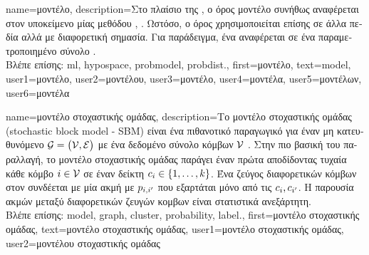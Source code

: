 {name={\foreignlanguage{greek}{μοντέλο}}, 
	description={\foreignlanguage{greek}{Στο πλαίσιο της} , 
		\foreignlanguage{greek}{ο όρος μοντέλο συνήθως αναφέρεται στον υποκείμενο}   
		\foreignlanguage{greek}{μίας μεθόδου}  \cite{MLBasics}, \cite{ShalevMLBook}. 
		\foreignlanguage{greek}{Ωστόσο, ο όρος χρησιμοποιείται επίσης σε άλλα πεδία αλλά με διαφορετική σημασία. 
		Για παράδειγμα, ένα}  \foreignlanguage{greek}{αναφέρεται σε ένα παραμετροποιημένο 
		σύνολο} .\\
		\foreignlanguage{greek}{Βλέπε επίσης:} \gls{ml}, \gls{hypospace}, \gls{probmodel}, \gls{probdist}.},
	first={\foreignlanguage{greek}{μοντέλο}},
	text={mod\-el},
	user1={\foreignlanguage{greek}{μοντέλο}}, %
	user2={\foreignlanguage{greek}{μοντέλου}}, %
	user3={\foreignlanguage{greek}{μοντέλο}}, %
	user4={\foreignlanguage{greek}{μοντέλα}}, %
	user5={\foreignlanguage{greek}{μοντέλων}}, %
	user6={\foreignlanguage{greek}{μοντέλα}} %
}

{name={\foreignlanguage{greek}{μοντέλο στοχαστικής ομάδας}},
	description={\foreignlanguage{greek}{Το μοντέλο στοχαστικής ομάδας}
		(sto\-chastic block model - SBM) \foreignlanguage{greek}{είναι ένα πιθανοτικό παραγωγικό}  
		\foreignlanguage{greek}{για έναν μη κατευθυνόμενο}  $\mathcal{G} = \big( \mathcal{V}, \mathcal{E} \big)$ 
		\foreignlanguage{greek}{με ένα δεδομένο σύνολο κόμβων} $\mathcal{V}$ \cite{AbbeSBM2018}. \foreignlanguage{greek}{Στην πιο 
		βασική του παραλλαγή, το μοντέλο στοχαστικής ομάδας παράγει έναν}  
		\foreignlanguage{greek}{πρώτα αποδίδοντας τυχαία κάθε κόμβο $i \in \mathcal{V}$ σε έναν δείκτη} 
		 $c_{i} \in \{1, \ldots, k\}$. \foreignlanguage{greek}{Ένα ζεύγος διαφορετικών 
		κόμβων στον}  \foreignlanguage{greek}{συνδέεται με μία ακμή με}  $p_{i,i'}$ 
		\foreignlanguage{greek}{που εξαρτάται μόνο από τις}  $c_{i}, c_{i'}$. 
		\foreignlanguage{greek}{Η παρουσία ακμών μεταξύ διαφορετικών ζευγών κομβων είναι στατιστικά ανεξάρτητη.} \\
		\foreignlanguage{greek}{Βλέπε επίσης:} \gls{model}, \gls{graph}, \gls{cluster}, \gls{probability}, \gls{label}.},
	first={\foreignlanguage{greek}{μοντέλο στοχαστικής ομάδας}},
	text={\foreignlanguage{greek}{μοντέλο στοχαστικής ομάδας}},
	user1={\foreignlanguage{greek}{μοντέλο στοχαστικής ομάδας}}, %
    	user2={\foreignlanguage{greek}{μοντέλου στοχαστικής ομάδας}} %
}

